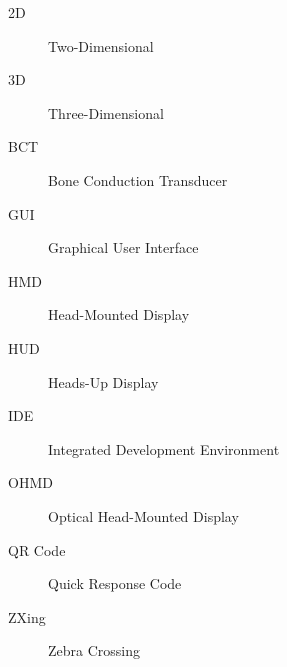 \begin{description}
	\item [2D] Two-Dimensional
	\item [3D] Three-Dimensional
	\item [BCT] Bone Conduction Transducer
	\item [GUI] Graphical User Interface
	\item [HMD] Head-Mounted Display
	\item [HUD] Heads-Up Display
	\item [IDE] Integrated Development Environment
	\item [OHMD] Optical Head-Mounted Display
	\item [QR Code] Quick Response Code
	\item [ZXing] Zebra Crossing
\end{description}